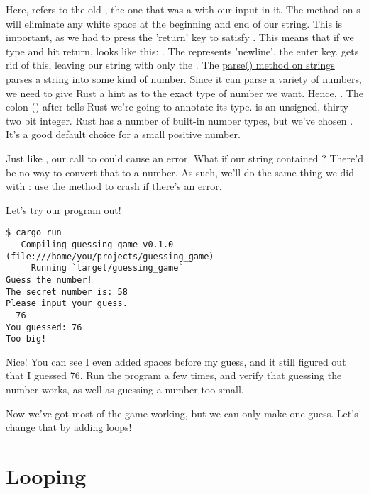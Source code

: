 Here,  refers to the old , the one that was a  with our input in it. The  method 
on s will eliminate any white space at the beginning and end of our string. This is important, as we had to press the
'return' key to satisfy . This means that if we type  and hit return,  looks like this: 
. The \code{\\n} represents 'newline', the enter key.  gets rid of this, leaving our string with only the 
. The \href{https://doc.rust-lang.org/std/primitive.str.html#method.parse}{parse() method on strings} parses a string into
some kind of number. Since it can parse a variety of numbers, we need to give Rust a hint as to the exact type of number we want.
Hence, . The colon (\code{:}) after  tells Rust we're going to annotate its type.  is 
an unsigned, thirty-two bit integer. Rust has a number of built-in number types, but we've chosen . It's a good default
choice for a small positive number.

\blank

Just like , our call to  could cause an error. What if our string contained ? 
There'd be no way to convert that to a number. As such, we'll do the same thing we did with : use the 
 method to crash if there's an error.

\blank

Let's try our program out!

\begin{verbatim}
$ cargo run
   Compiling guessing_game v0.1.0 (file:///home/you/projects/guessing_game)
     Running `target/guessing_game`
Guess the number!
The secret number is: 58
Please input your guess.
  76
You guessed: 76
Too big!
\end{verbatim}

Nice! You can see I even added spaces before my guess, and it still figured out that I guessed 76. Run the program a few times, 
and verify that guessing the number works, as well as guessing a number too small.

\blank

Now we've got most of the game working, but we can only make one guess. Let's change that by adding loops!

\section{Looping}

